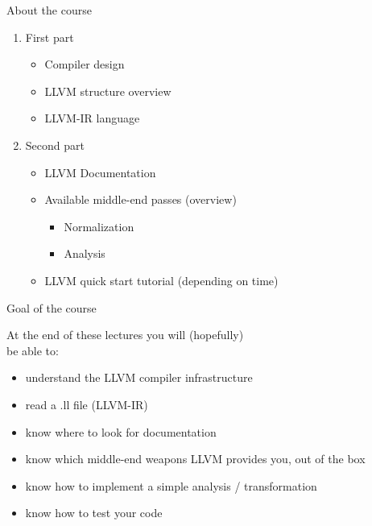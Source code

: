 \begin{frame}{About the course}
\begin{center}
\begin{varwidth}{8.5cm}
  \begin{Large}
  \begin{enumerate}
  	\setlength\itemsep{8pt}
    \item First part \vspace{6pt}
      \begin{itemize}
      	\normalsize \setlength\itemsep{4pt}
        \item Compiler design
        \item LLVM structure overview
        \item LLVM-IR language
    	\end{itemize}
    \item Second part \vspace{6pt}
      \begin{itemize}
      \normalsize \setlength\itemsep{4pt}
        \item LLVM Documentation
        \item Available middle-end passes (overview)
        \begin{itemize}
        	\normalsize
          \item Normalization
          \item Analysis
        \end{itemize}
        \item LLVM quick start tutorial (depending on time)
      \end{itemize}
  \end{enumerate}
	\end{Large}
\end{varwidth}
\end{center}
\end{frame}


\begin{frame}{Goal of the course}
	\begin{center}
	\begin{varwidth}{8.5cm}
  At the end of these lectures you will (hopefully)\\ be able to:
  \medskip
  \begin{itemize}
    \item understand the LLVM compiler infrastructure
    \item read a .ll file (LLVM-IR)
    \item know where to look for documentation
    \item know which middle-end weapons
          LLVM provides you, out of the box
    \item know how to implement a simple analysis / transformation
    \item know how to test your code
  \end{itemize}
  \end{varwidth}
  \end{center}
\end{frame}


